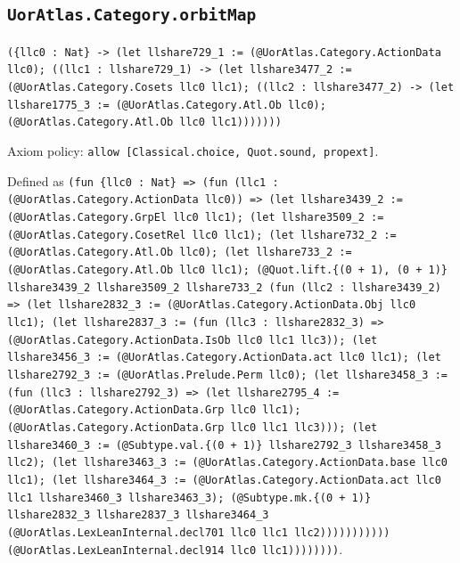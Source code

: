 \documentclass[11pt]{article}
\begin{document}
\subsection*{\texttt{UorAtlas.Category.orbitMap}}
\noindent\texttt{(\{llc0 : Nat\} -> (let llshare729\_1 := (@UorAtlas.Category.ActionData llc0); ((llc1 : llshare729\_1) -> (let llshare3477\_2 := (@UorAtlas.Category.Cosets llc0 llc1); ((llc2 : llshare3477\_2) -> (let llshare1775\_3 := (@UorAtlas.Category.Atl.Ob llc0); (@UorAtlas.Category.Atl.Ob llc0 llc1)))))))}\par
\noindent Axiom policy: \texttt{allow [Classical.choice, Quot.sound, propext]}.\par
\noindent Defined as \texttt{(fun \{llc0 : Nat\} => (fun (llc1 : (@UorAtlas.Category.ActionData llc0)) => (let llshare3439\_2 := (@UorAtlas.Category.GrpEl llc0 llc1); (let llshare3509\_2 := (@UorAtlas.Category.CosetRel llc0 llc1); (let llshare732\_2 := (@UorAtlas.Category.Atl.Ob llc0); (let llshare733\_2 := (@UorAtlas.Category.Atl.Ob llc0 llc1); (@Quot.lift.\{(0 + 1), (0 + 1)\} llshare3439\_2 llshare3509\_2 llshare733\_2 (fun (llc2 : llshare3439\_2) => (let llshare2832\_3 := (@UorAtlas.Category.ActionData.Obj llc0 llc1); (let llshare2837\_3 := (fun (llc3 : llshare2832\_3) => (@UorAtlas.Category.ActionData.IsOb llc0 llc1 llc3)); (let llshare3456\_3 := (@UorAtlas.Category.ActionData.act llc0 llc1); (let llshare2792\_3 := (@UorAtlas.Prelude.Perm llc0); (let llshare3458\_3 := (fun (llc3 : llshare2792\_3) => (let llshare2795\_4 := (@UorAtlas.Category.ActionData.Grp llc0 llc1); (@UorAtlas.Category.ActionData.Grp llc0 llc1 llc3))); (let llshare3460\_3 := (@Subtype.val.\{(0 + 1)\} llshare2792\_3 llshare3458\_3 llc2); (let llshare3463\_3 := (@UorAtlas.Category.ActionData.base llc0 llc1); (let llshare3464\_3 := (@UorAtlas.Category.ActionData.act llc0 llc1 llshare3460\_3 llshare3463\_3); (@Subtype.mk.\{(0 + 1)\} llshare2832\_3 llshare2837\_3 llshare3464\_3 (@UorAtlas.LexLeanInternal.decl701 llc0 llc1 llc2))))))))))) (@UorAtlas.LexLeanInternal.decl914 llc0 llc1))))))))}.\par
\end{document}
